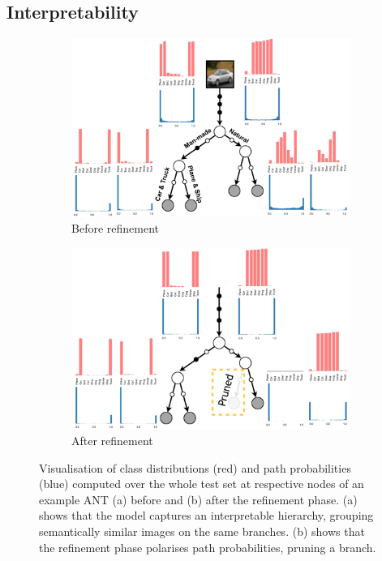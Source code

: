 \subsection{Interpretability}
\begin{figure}[t!]
	\center
	\begin{subfigure}[t]{\linewidth}
		\includegraphics[width=\linewidth]{chapter_7/figures/fig_7_9.png}
		\vspace{-6mm}
		\caption{Before refinement}
	\end{subfigure}
	\hspace{4.66mm}
	\begin{subfigure}[t]{\linewidth}
		\includegraphics[width=\linewidth]{chapter_7/figures/fig_7_10.png}
		\vspace{-6mm}
		\caption{After refinement}
	\end{subfigure}
	\caption{\footnotesize Visualisation of class distributions (red) and path probabilities (blue) computed over the whole test set at respective nodes of an example ANT (a) before and (b) after the refinement phase. (a) shows that the model captures an interpretable hierarchy, grouping semantically similar images on the same branches. (b) shows that the refinement phase polarises path probabilities, pruning a branch.}
	\label{fig:learnedmodel}
\end{figure}

